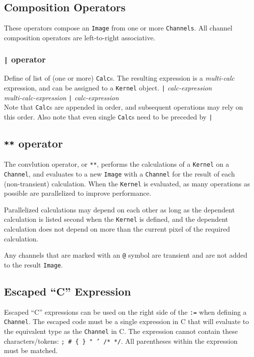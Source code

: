 \subsection{Composition Operators}
\label{ssec:compositionops}
These operators compose an \texttt{Image} from one or more \texttt{Channels}.
All channel composition operators are left-to-right associative.

\subsubsection{\texttt{|} operator}
\label{sssec:barop}
Define of list of (one or more) \texttt{Calc}s. The resulting expression is a
\emph{multi-calc} expression, and can be assigned
to a \texttt{Kernel} object.
\startsyn
\texttt{|} \emph{calc-expression} \\
\emph{multi-calc-expression} \texttt{|} \emph{calc-expression} \\
\stopsyn
Note that \texttt{Calc}s are appended in order, and
subsequent operations may rely on this order.
Also note that even single \texttt{Calc}s need to be preceded by \texttt{|}

\subsection{\texttt{**} operator}
\label{ssec:convolutionop}

The convlution operator, or \texttt{**}, performs the calculations of a
\texttt{Kernel} on a \texttt{Channel}, and evaluates to a new \texttt{Image} 
with a \texttt{Channel} for the result of each (non-transient) calculation.
When the \texttt{Kernel} is evaluated, as many operations as possible are
parallelized to improve performance.

Parallelized calculations may depend on each other as long as the
dependent calculation is listed second when the \texttt{Kernel} is
defined, and the dependent calculation does not depend on more than
the current pixel of the required calculation.

Any channels that are marked with an \texttt{@} symbol are transient and
are not added to the result \texttt{Image}.

\subsection{Escaped ``C'' Expression}
\label{ssec:escapedC}

Escaped ``C'' expressions can be used on the right side of the \texttt{:=}
when defining a \texttt{Channel}. The escaped code must be a single expression
in C that will evaluate to the equivalent type as the \texttt{Channel} in C.
The expression cannot contain these characters/tokens:
\texttt{; \# \{ \} " ' /* */}. All parentheses within the expression must be matched.

